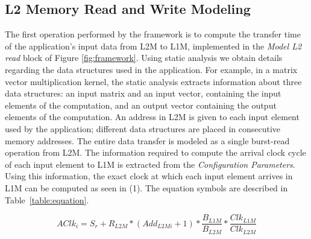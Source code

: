\subsection{L2 Memory Read and Write Modeling}
\label{ssec:l2_read_model}
\vspace{-1mm}
The first operation performed by the framework is to compute the transfer time of the application's input data from L2M to L1M, implemented in the \textit{Model L2 read} block of Figure \ref{fig:framework}. Using static analysis we obtain details regarding the data structures used in the application. For example, in a matrix vector multiplication kernel, the static analysis extracts information about three data structures: an input matrix and an input vector, containing the input elements of the computation, and an output vector containing the output elements of the computation. An address in L2M is given to each input element used by the application; different data structures are placed in consecutive memory addresses. The entire data transfer is modeled as a single burst-read operation from L2M. The information required to compute the arrival clock cycle of each input element to L1M is extracted from the \textit{Configuration Parameters}.
Using this information, the exact clock at which each input element arrives in L1M can be computed as seen in (1). The equation symbols are described in Table~\ref{table:equation}.

\begin{equation}
AClk_i = S_r + R_{L2M} * (Add_{L2Mi}+1) * \frac{B_{L1M}}{B_{L2M}} * \frac{Clk_{L1M}}{Clk_{L2M}}
\end{equation}

